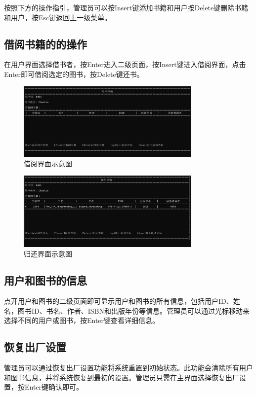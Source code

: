 \documentclass{article}
\begin{document}
按照下方的操作指引，管理员可以按Insert键添加书籍和用户按Delete键删除书籍和用户，按Esc键返回上一级菜单。
\subsection{借阅书籍的的操作}

在用户界面选择借书者，按Enter进入二级页面，按Insert键进入借阅界面，点击Enter即可借阅选定的图书，按Delete键还书。

\begin{figure}[H]
    \centering
    \includegraphics[width=0.8\textwidth]{borrow.png}
    \caption{借阅界面示意图}
\end{figure}

\begin{figure}[H]
    \centering
    \includegraphics[width=0.8\textwidth]{manipulate.png}
    \caption{归还界面示意图}
\end{figure}

\subsection{用户和图书的信息}
点开用户和图书的二级页面即可显示用户和图书的所有信息，包括用户ID、姓名，图书ID、书名、作者、ISBN和出版年份等信息。管理员可以通过光标移动来选择不同的用户或图书，按Enter键查看详细信息。
\subsection{恢复出厂设置}
管理员可以通过恢复出厂设置功能将系统重置到初始状态。此功能会清除所有用户和图书信息，并将系统恢复到最初的设置。管理员只需在主界面选择恢复出厂设置，按Enter键确认即可。
\end{document}
